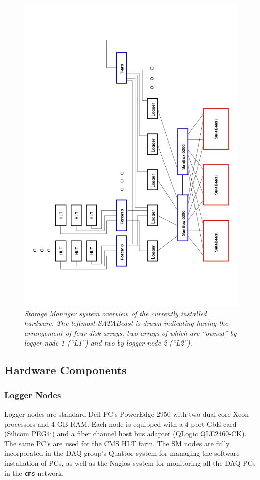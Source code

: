 \begin{figure}[tbh]
\begin{center}  
\includegraphics[width=1.0\textwidth]{Hardware/SMsystem}
\caption{\emph{ Storage Manager system overview of the currently installed hardware. 
The leftmost SATABeast is drawn indicating having the arrangement of four disk arrays, 
two arrays of which are ``owned'' by logger node 1 (``L1'') and two by logger node 2 (``L2'').}}
\label{fig:system}
\end{center}
\end{figure}  


\subsection{Hardware Components}

\subsubsection{Logger Nodes}
Logger nodes are standard Dell PC's PowerEdge 2950 with two dual-core Xeon processors and 4 GB RAM. 
Each node is equipped with a 4-port GbE card (Silicom PEG4i) and 
a fiber channel host bus adapter (QLogic QLE2460-CK). 
The same PC's are used for the CMS HLT farm.
The SM nodes are fully incorporated in the DAQ group's Quattor system for managing 
the software installation of PCs, as well as the Nagios system
for monitoring all the DAQ PCs in the \verb+cms+ network.

